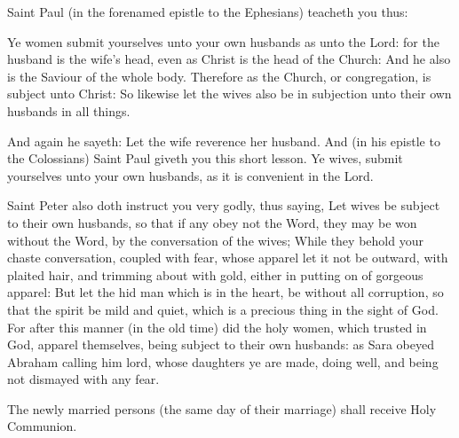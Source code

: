     Saint Paul (in the forenamed epistle to the Ephesians) teacheth you thus:\par
    Ye women submit yourselves unto your own husbands as unto the Lord: for the husband is the wife's head, even as Christ is the head of the Church: And he also is the Saviour of the whole body. Therefore as the Church, or congregation, is subject unto Christ: So likewise let the wives also be in subjection unto their own husbands in all things.\par
    And again he sayeth: Let the wife reverence her husband. And (in his epistle to the Colossians) Saint Paul giveth you this short lesson. Ye wives, submit yourselves unto your own husbands, as it is convenient in the Lord.\par
    Saint Peter also doth instruct you very godly, thus saying, Let wives be subject to their own husbands, so that if any obey not the Word, they may be won without the Word, by the conversation of the wives; While they behold your chaste conversation, coupled with fear, whose apparel let it not be outward, with plaited hair, and trimming about with gold, either in putting on of gorgeous apparel: But let the hid man which is in the heart, be without all corruption, so that the spirit be mild and quiet, which is a precious thing in the sight of God. For after this manner (in the old time) did the holy women, which trusted in God, apparel themselves, being subject to their own husbands: as Sara obeyed Abraham calling him lord, whose daughters ye are made, doing well, and being not dismayed with any fear.
\begin{rubric}
	The newly married persons (the same day of their marriage) shall receive Holy Communion. 
\end{rubric}
